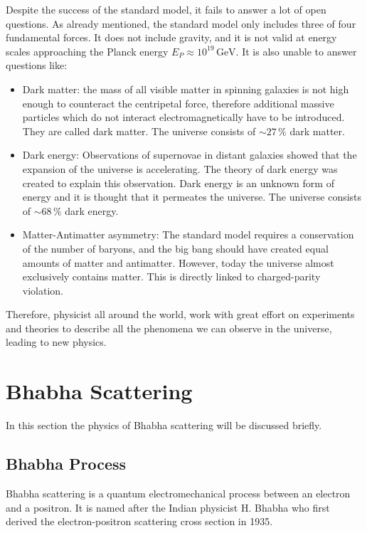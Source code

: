 \documentclass[a4paper,11pt,twosided,final,german,openbib,pdftex,listof=totoc,bibliography=totoc]{scrbook}
\begin{document}
Despite the success of the standard model, it fails to answer a lot of open questions. As already mentioned, the standard model only includes three of four fundamental forces. It does not include gravity, and it is not valid at energy scales approaching the Planck energy $E_P \approx 10^{19}\,\textrm{GeV} $.\cite{sivaram2007special} It is also unable to answer questions like:

\begin{itemize}
	
\item Dark matter: the mass of all visible matter in spinning galaxies is not high enough to counteract the centripetal force, therefore additional massive particles which do not interact electromagnetically have to be introduced. They are called dark matter. The universe consists of $\sim 27\,\%$ dark matter.\cite{DarkMAtter}


\item Dark energy: Observations of supernovae in distant galaxies showed that the expansion of the universe is accelerating. The theory of dark energy was created to explain this observation. Dark energy is an unknown form of energy and it is thought that it permeates the universe. The universe consists of $\sim 68\,\%$ dark energy.\cite{Janka}


\item  Matter-Antimatter asymmetry: The standard model requires a conservation of the number of baryons, and the big bang should have created equal amounts of matter and antimatter. However, today the universe almost exclusively contains matter. This is directly linked to charged-parity violation.\cite{HAMBYE2012193}


\end{itemize}

Therefore, physicist all around the world, work with great effort on experiments and theories to describe all the phenomena we can observe in the universe, leading to new physics.

\section{Bhabha Scattering}
\label{sec:Bhabha}

In this section the physics of Bhabha scattering will be discussed briefly.
 
\subsection{Bhabha Process}
 \label{sec:BhabhaProcess}
 Bhabha scattering is a quantum electromechanical process between an electron and a positron. It is named after the Indian  physicist H. Bhabha who first derived the electron-positron scattering cross section in 1935.\cite{Bhabha}
 
\end{document}
